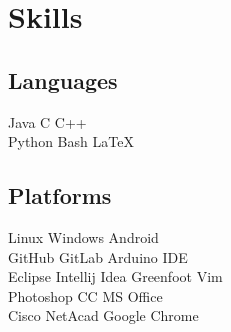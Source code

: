 \documentclass[dvipsnames]{deedy-resume-openfont}
\begin{document}




  \begin{minipage}[t]{0.32\textwidth} 


  \section{Skills}
  \subsection{Languages}
   Java \textbullet{} C \textbullet{} C++ \\
   Python \textbullet{} Bash \textbullet{} \LaTeX\ \\
  \subsection{Platforms}
  Linux \textbullet{} Windows \textbullet{} Android \\
  GitHub \textbullet{} GitLab \textbullet{} Arduino IDE \\
  Eclipse \textbullet{} Intellij Idea \textbullet{} Greenfoot \textbullet{} Vim \\
  Photoshop CC \textbullet{} MS Office \\
  Cisco NetAcad \textbullet{} Google Chrome \\
  


\end{minipage}
\end{document}
